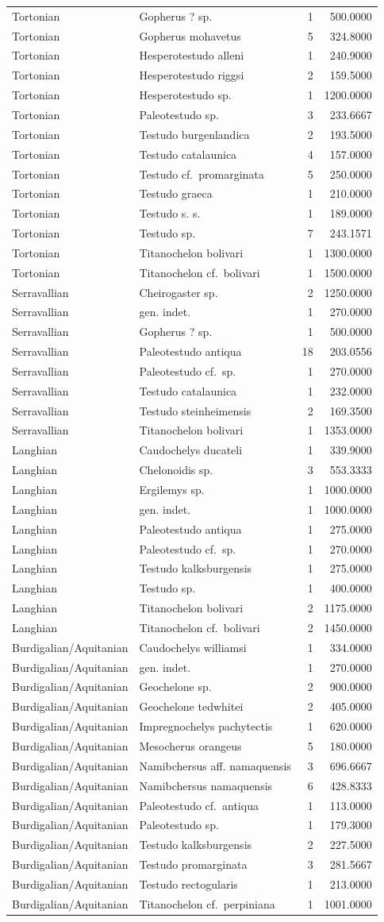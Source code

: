 \documentclass[]{article}
\begin{document}
\begin{longtable}[]{@{}llrr@{}}
Tortonian & Gopherus ? sp. & 1 & 500.0000\tabularnewline
Tortonian & Gopherus mohavetus & 5 & 324.8000\tabularnewline
Tortonian & Hesperotestudo alleni & 1 & 240.9000\tabularnewline
Tortonian & Hesperotestudo riggsi & 2 & 159.5000\tabularnewline
Tortonian & Hesperotestudo sp. & 1 & 1200.0000\tabularnewline
Tortonian & Paleotestudo sp. & 3 & 233.6667\tabularnewline
Tortonian & Testudo burgenlandica & 2 & 193.5000\tabularnewline
Tortonian & Testudo catalaunica & 4 & 157.0000\tabularnewline
Tortonian & Testudo cf.~promarginata & 5 & 250.0000\tabularnewline
Tortonian & Testudo graeca & 1 & 210.0000\tabularnewline
Tortonian & Testudo s. s. & 1 & 189.0000\tabularnewline
Tortonian & Testudo sp. & 7 & 243.1571\tabularnewline
Tortonian & Titanochelon bolivari & 1 & 1300.0000\tabularnewline
Tortonian & Titanochelon cf.~bolivari & 1 & 1500.0000\tabularnewline
Serravallian & Cheirogaster sp. & 2 & 1250.0000\tabularnewline
Serravallian & gen. indet. & 1 & 270.0000\tabularnewline
Serravallian & Gopherus ? sp. & 1 & 500.0000\tabularnewline
Serravallian & Paleotestudo antiqua & 18 & 203.0556\tabularnewline
Serravallian & Paleotestudo cf.~sp. & 1 & 270.0000\tabularnewline
Serravallian & Testudo catalaunica & 1 & 232.0000\tabularnewline
Serravallian & Testudo steinheimensis & 2 & 169.3500\tabularnewline
Serravallian & Titanochelon bolivari & 1 & 1353.0000\tabularnewline
Langhian & Caudochelys ducateli & 1 & 339.9000\tabularnewline
Langhian & Chelonoidis sp. & 3 & 553.3333\tabularnewline
Langhian & Ergilemys sp. & 1 & 1000.0000\tabularnewline
Langhian & gen. indet. & 1 & 1000.0000\tabularnewline
Langhian & Paleotestudo antiqua & 1 & 275.0000\tabularnewline
Langhian & Paleotestudo cf.~sp. & 1 & 270.0000\tabularnewline
Langhian & Testudo kalksburgensis & 1 & 275.0000\tabularnewline
Langhian & Testudo sp. & 1 & 400.0000\tabularnewline
Langhian & Titanochelon bolivari & 2 & 1175.0000\tabularnewline
Langhian & Titanochelon cf.~bolivari & 2 & 1450.0000\tabularnewline
Burdigalian/Aquitanian & Caudochelys williamsi & 1 &
334.0000\tabularnewline
Burdigalian/Aquitanian & gen. indet. & 1 & 270.0000\tabularnewline
Burdigalian/Aquitanian & Geochelone sp. & 2 & 900.0000\tabularnewline
Burdigalian/Aquitanian & Geochelone tedwhitei & 2 &
405.0000\tabularnewline
Burdigalian/Aquitanian & Impregnochelys pachytectis & 1 &
620.0000\tabularnewline
Burdigalian/Aquitanian & Mesocherus orangeus & 5 &
180.0000\tabularnewline
Burdigalian/Aquitanian & Namibchersus aff. namaquensis & 3 &
696.6667\tabularnewline
Burdigalian/Aquitanian & Namibchersus namaquensis & 6 &
428.8333\tabularnewline
Burdigalian/Aquitanian & Paleotestudo cf.~antiqua & 1 &
113.0000\tabularnewline
Burdigalian/Aquitanian & Paleotestudo sp. & 1 & 179.3000\tabularnewline
Burdigalian/Aquitanian & Testudo kalksburgensis & 2 &
227.5000\tabularnewline
Burdigalian/Aquitanian & Testudo promarginata & 3 &
281.5667\tabularnewline
Burdigalian/Aquitanian & Testudo rectogularis & 1 &
213.0000\tabularnewline
Burdigalian/Aquitanian & Titanochelon cf.~perpiniana & 1 &
1001.0000\tabularnewline
\bottomrule
\end{longtable}
\end{document}
